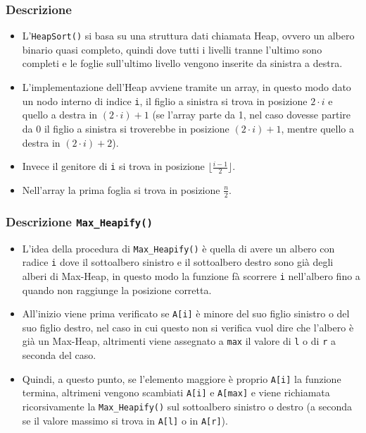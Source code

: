 \documentclass{article}
\begin{document}
\subsubsection{Descrizione}

\begin{itemize}
    \item L'\verb|HeapSort()| si basa su una struttura dati chiamata Heap, ovvero un albero binario quasi completo, quindi dove tutti i livelli tranne l'ultimo sono completi e le foglie sull'ultimo livello vengono inserite da sinistra a destra.
    \item L'implementazione dell'Heap avviene tramite un array, in questo modo dato un nodo interno di indice \verb|i|, il figlio a sinistra si trova in posizione $2 \cdot i$ e quello a destra in $(2 \cdot i) + 1$ (se l'array parte da 1, nel caso dovesse partire da 0 il figlio a sinistra si troverebbe in posizione $(2 \cdot i) + 1$, mentre quello a destra in $(2 \cdot i) + 2$).
    \item Invece il genitore di \verb|i| si trova in posizione $\lfloor \frac{i - 1}{2} \rfloor$.
    \item Nell'array la prima foglia si trova in posizione $\frac{n}{2}$.
\end{itemize}

\cprotect\subsubsection{Descrizione \verb|Max_Heapify()|}

\begin{itemize}
    \item L'idea della procedura di \verb|Max_Heapify()| è quella di avere un albero con radice \verb|i| dove il sottoalbero sinistro e il sottoalbero destro sono già degli alberi di Max-Heap, in questo modo la funzione fà scorrere \verb|i| nell'albero fino a quando non raggiunge la posizione corretta.
    \item All'inizio viene prima verificato se \verb|A[i]| è minore del suo figlio sinistro o del suo figlio destro, nel caso in cui questo non si verifica vuol dire che l'albero è già un Max-Heap, altrimenti viene assegnato a \verb|max| il valore di \verb|l| o di \verb|r| a seconda del caso.
    \item Quindi, a questo punto, se l'elemento maggiore è proprio \verb|A[i]| la funzione termina, altrimeni vengono scambiati \verb|A[i]| e \verb|A[max]| e viene richiamata ricorsivamente la \verb|Max_Heapify()| sul sottoalbero sinistro o destro (a seconda se il valore massimo si trova in \verb|A[l]| o in \verb|A[r]|).
\end{itemize}
\end{document}
